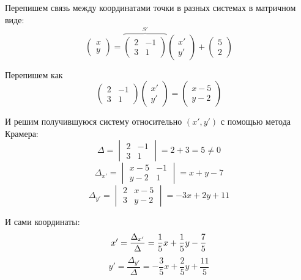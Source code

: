 \documentclass[a4paper,12pt]{article}
\begin{document}
  \begin{solution}
    Перепишем связь между координатами точки в разных системах в матричном виде:
    \begin{equation}\label{eq:problem1-x-to-x-prime}
      \begin{pmatrix}
        x\\
        y
      \end{pmatrix}
      = \overbrace{\begin{pmatrix}
        2 & -1\\
        3 & 1
      \end{pmatrix}}^{S'}
      \begin{pmatrix}
        x'\\
        y'
      \end{pmatrix}
      + \begin{pmatrix}
        5\\
        2
      \end{pmatrix}
    \end{equation}
    
    Перепишем как
    \[
      \begin{pmatrix}
        2 & -1\\
        3 & 1
      \end{pmatrix}
      \begin{pmatrix}
        x'\\
        y'
      \end{pmatrix}
      = \begin{pmatrix}
        x - 5\\
        y - 2
      \end{pmatrix}
    \]
    
    И решим получившуюся систему относительно $(x', y')$ с помощью метода Крамера:
    \[
      \Delta = \begin{vmatrix} 2 & -1 \\ 3 & 1 \end{vmatrix} = 2 + 3 = 5 \not= 0
    \]
    \[
      \Delta_{x'} = \begin{vmatrix} x - 5 & -1 \\ y - 2 & 1 \end{vmatrix} = x + y - 7
    \]
    \[
      \Delta_{y'} = \begin{vmatrix} 2 & x - 5 \\ 3 & y - 2 \end{vmatrix} = -3x + 2y + 11
    \]
    
    И сами координаты:
    \[
      x' = \frac{\Delta_{x'}}{\Delta} = \frac{1}{5} x + \frac{1}{5} y - \frac{7}{5}\\
    \]
    \[
      y' = \frac{\Delta_{y'}}{\Delta} = -\frac{3}{5} x + \frac{2}{5} y + \frac{11}{5}
    \]
    

\end{solution}
\end{document}
